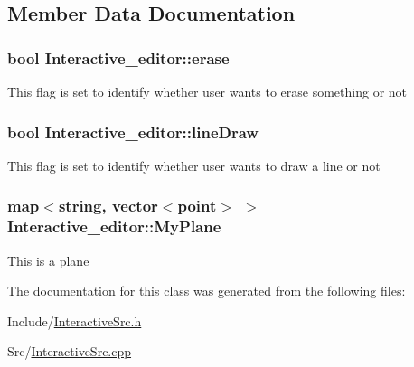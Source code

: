 \subsection{Member Data Documentation}
\subsubsection[{\texorpdfstring{erase}{erase}}]{\setlength{\rightskip}{0pt plus 5cm}bool Interactive\+\_\+editor\+::erase}\hypertarget{classInteractive__editor_ac2f2f1dfb6c21585d4ed5ed043e41b25}{}\label{classInteractive__editor_ac2f2f1dfb6c21585d4ed5ed043e41b25}
This flag is set to identify whether user wants to erase something or not 
\subsubsection[{\texorpdfstring{line\+Draw}{lineDraw}}]{\setlength{\rightskip}{0pt plus 5cm}bool Interactive\+\_\+editor\+::line\+Draw}\hypertarget{classInteractive__editor_aa0de8abac09ce2259252fba6c1958e83}{}\label{classInteractive__editor_aa0de8abac09ce2259252fba6c1958e83}
This flag is set to identify whether user wants to draw a line or not 
\subsubsection[{\texorpdfstring{My\+Plane}{MyPlane}}]{\setlength{\rightskip}{0pt plus 5cm}map$<$string, vector$<${\bf point}$>$ $>$ Interactive\+\_\+editor\+::\+My\+Plane}\hypertarget{classInteractive__editor_a1e77c81fdaf1da82816d476fa431fc34}{}\label{classInteractive__editor_a1e77c81fdaf1da82816d476fa431fc34}
This is a plane 

The documentation for this class was generated from the following files\+:\begin{DoxyCompactItemize}
\item 
Include/\hyperlink{InteractiveSrc_8h}{Interactive\+Src.\+h}\item 
Src/\hyperlink{InteractiveSrc_8cpp}{Interactive\+Src.\+cpp}\end{DoxyCompactItemize}
